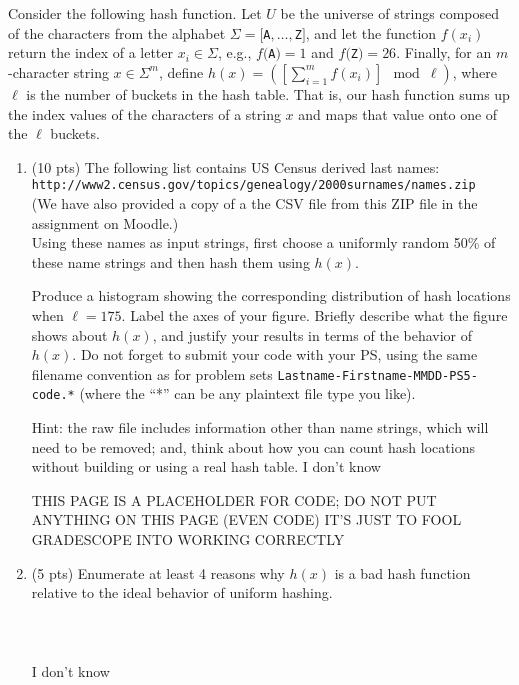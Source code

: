 \documentclass[12pt]{article}
\begin{document}
\begin{enumerate}
	\smallskip Consider the following hash function. Let $U$ be the universe of strings composed of the characters from the alphabet $\Sigma=[${\tt A}$,\dots,${\tt Z}$]$, and let the function $f(x_{i})$ return the index of a letter $x_{i}\in \Sigma$, e.g., $f(${\tt A}$)=1$ and $f(${\tt Z}$)=26$. Finally, for an $m$-character string $x\in \Sigma^{m}$, define $h(x) = \left(\left[\sum_{i=1}^{m}f(x_{i})\right]\!\! \mod \ell\right)$, where $\ell$ is the number of buckets in the hash table. That is, our hash function sums up the index values of the characters of a string $x$ and maps that value onto one of the $\ell$ buckets.
	
	\begin{enumerate}
	\item \label{2a} (10 pts) The following list contains US Census derived last names: \\
	{\tt http://www2.census.gov/topics/genealogy/2000surnames/names.zip} \\
	(We have also provided a copy of a the CSV file from this ZIP file in the assignment on Moodle.) \\
	Using these names as input strings, first choose a uniformly random 50\% of these name strings and then hash them using $h(x)$.
	
	Produce a histogram showing the corresponding distribution of hash locations when $\ell=175$. Label the axes of your figure. Briefly describe what the figure shows about $h(x)$, and justify your results in terms of the behavior of $h(x)$. Do not forget to submit your code with your PS, using the same filename convention as for problem sets {\tt Lastname-Firstname-MMDD-PS5-code.*} (where the ``*'' can be any plaintext file type you like).
	 
	{\footnotesize Hint: the raw file includes information other than name strings, which will need to be removed; and, think about how you can count hash locations without building or using a real hash table.}
	\newpage
	I don't know
	\phantom{Delete this once you write your answer}
	\pagebreak
	
		THIS PAGE IS A PLACEHOLDER FOR CODE; DO NOT PUT ANYTHING ON THIS PAGE (EVEN CODE) IT'S JUST TO FOOL GRADESCOPE INTO WORKING CORRECTLY
	
	\pagebreak


	\item \label{2b} (5 pts) Enumerate at least 4 reasons why $h(x)$ is a bad hash function relative to the ideal behavior of uniform hashing.
	\\ \\ \\ \\I don't know
	\pagebreak
	

\end{enumerate}
\end{enumerate}
\end{document}
